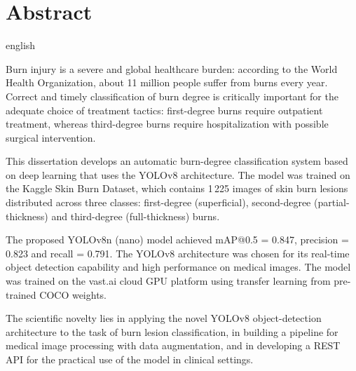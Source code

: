 \chapter{Abstract}
\thispagestyle{empty}
\begin{SingleSpace}
\begin{otherlanguage*}{english}

\noindent Burn injury is a severe and global healthcare burden: according to the World Health Organization, about 11 million people suffer from burns every year. Correct and timely classification of burn degree is critically important for the adequate choice of treatment tactics: first-degree burns require outpatient treatment, whereas third-degree burns require hospitalization with possible surgical intervention.

\noindent This dissertation develops an automatic burn-degree classification system based on deep learning that uses the YOLOv8 architecture. The model was trained on the Kaggle Skin Burn Dataset, which contains 1\,225 images of skin burn lesions distributed across three classes: first-degree (superficial), second-degree (partial-thickness) and third-degree (full-thickness) burns.

\noindent The proposed YOLOv8n (nano) model achieved mAP@0.5 = 0.847, precision = 0.823 and recall = 0.791. The YOLOv8 architecture was chosen for its real-time object detection capability and high performance on medical images. The model was trained on the vast.ai cloud GPU platform using transfer learning from pre-trained COCO weights.

\noindent The scientific novelty lies in applying the novel YOLOv8 object-detection architecture to the task of burn lesion classification, in building a pipeline for medical image processing with data augmentation, and in developing a REST API for the practical use of the model in clinical settings.

\vspace{0.8em}
\par{}

\end{otherlanguage*}
\end{SingleSpace}

